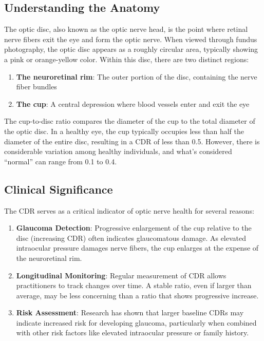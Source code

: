\documentclass[
  Letterpaper,
]{scrbook}
\providecommand{\tightlist}{%
  \setlength{\itemsep}{0pt}\setlength{\parskip}{0pt}}\usepackage{longtable,booktabs,array}
\begin{document}
\subsection{Understanding the Anatomy}\label{understanding-the-anatomy}

The optic disc, also known as the optic nerve head, is the point where
retinal nerve fibers exit the eye and form the optic nerve. When viewed
through fundus photography, the optic disc appears as a roughly circular
area, typically showing a pink or orange-yellow color. Within this disc,
there are two distinct regions:

\begin{enumerate}
\def\labelenumi{\arabic{enumi}.}
\tightlist
\item
  \textbf{The neuroretinal rim}: The outer portion of the disc,
  containing the nerve fiber bundles
\item
  \textbf{The cup}: A central depression where blood vessels enter and
  exit the eye
\end{enumerate}

The cup-to-disc ratio compares the diameter of the cup to the total
diameter of the optic disc. In a healthy eye, the cup typically occupies
less than half the diameter of the entire disc, resulting in a CDR of
less than 0.5. However, there is considerable variation among healthy
individuals, and what's considered ``normal'' can range from 0.1 to 0.4.

\subsection{Clinical Significance}\label{clinical-significance}

The CDR serves as a critical indicator of optic nerve health for several
reasons:

\begin{enumerate}
\def\labelenumi{\arabic{enumi}.}
\item
  \textbf{Glaucoma Detection}: Progressive enlargement of the cup
  relative to the disc (increasing CDR) often indicates glaucomatous
  damage. As elevated intraocular pressure damages nerve fibers, the cup
  enlarges at the expense of the neuroretinal rim.
\item
  \textbf{Longitudinal Monitoring}: Regular measurement of CDR allows
  practitioners to track changes over time. A stable ratio, even if
  larger than average, may be less concerning than a ratio that shows
  progressive increase.
\item
  \textbf{Risk Assessment}: Research has shown that larger baseline CDRs
  may indicate increased risk for developing glaucoma, particularly when
  combined with other risk factors like elevated intraocular pressure or
  family history.
\end{enumerate}
\end{document}
